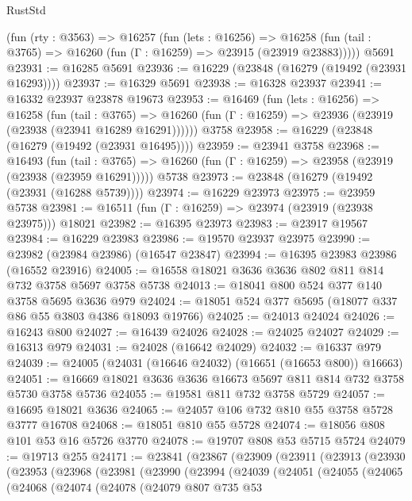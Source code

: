 \begin{lexlean}{RustStd}
\begin{coremodule}
    (fun (rty : @3563) =>
    @16257
      (fun (lets : @16256) =>
      @16258 (fun (tail : @3765) => @16260 (fun (Γ : @16259) => @23915 (@23919 @23883)))))
    @5691
@23931 := @16285 @5691
@23936 := @16229 (@23848 (@16279 (@19492 (@23931 @16293))))
@23937 := @16329 @5691
@23938 := @16328 @23937
@23941 := @16332 @23937 @23878 @19673
@23953 := @16469
    (fun (lets : @16256) =>
    @16258
      (fun (tail : @3765) =>
      @16260 (fun (Γ : @16259) => @23936 (@23919 (@23938 (@23941 @16289 @16291))))))
    @3758
@23958 := @16229 (@23848 (@16279 (@19492 (@23931 @16495))))
@23959 := @23941 @3758
@23968 := @16493
    (fun (tail : @3765) => @16260 (fun (Γ : @16259) => @23958 (@23919 (@23938 (@23959 @16291)))))
    @5738
@23973 := @23848 (@16279 (@19492 (@23931 (@16288 @5739))))
@23974 := @16229 @23973
@23975 := @23959 @5738
@23981 := @16511 (fun (Γ : @16259) => @23974 (@23919 (@23938 @23975))) @18021
@23982 := @16395 @23973
@23983 := @23917 @19567
@23984 := @16229 @23983
@23986 := @19570 @23937 @23975
@23990 := @23982 (@23984 @23986) (@16547 @23847)
@23994 := @16395 @23983 @23986 (@16552 @23916)
@24005 := @16558 @18021 @3636 @3636 @802 @811 @814 @732 @3758 @5697 @3758 @5738
@24013 := @18041 @800 @524 @377 @140 @3758 @5695 @3636 @979
@24024 := @18051 @524 @377 @5695 (@18077 @337 @86 @55 @3803 @4386 @18093 @19766)
@24025 := @24013 @24024
@24026 := @16243 @800
@24027 := @16439 @24026
@24028 := @24025 @24027
@24029 := @16313 @979
@24031 := @24028 (@16642 @24029)
@24032 := @16337 @979
@24039 := @24005 (@24031 (@16646 @24032) (@16651 (@16653 @800)) @16663)
@24051 := @16669 @18021 @3636 @3636 @16673 @5697 @811 @814 @732 @3758 @5730 @3758 @5736
@24055 := @19581 @811 @732 @3758 @5729
@24057 := @16695 @18021 @3636
@24065 := @24057 @106 @732 @810 @55 @3758 @5728 @3777 @16708
@24068 := @18051 @810 @55 @5728
@24074 := @18056 @808 @101 @53 @16 @5726 @3770
@24078 := @19707 @808 @53 @5715 @5724
@24079 := @19713 @255
@24171 := @23841
    (@23867
      (@23909
        (@23911
          (@23913
            (@23930
              (@23953
                (@23968
                  (@23981
                    (@23990
                      (@23994
                        (@24039
                          (@24051
                            (@24055
                              (@24065
                                (@24068
                                  (@24074
                                    (@24078
                                      (@24079
                                        @807
                                        @735
                                        @53

\end{coremodule}
\end{lexlean}
